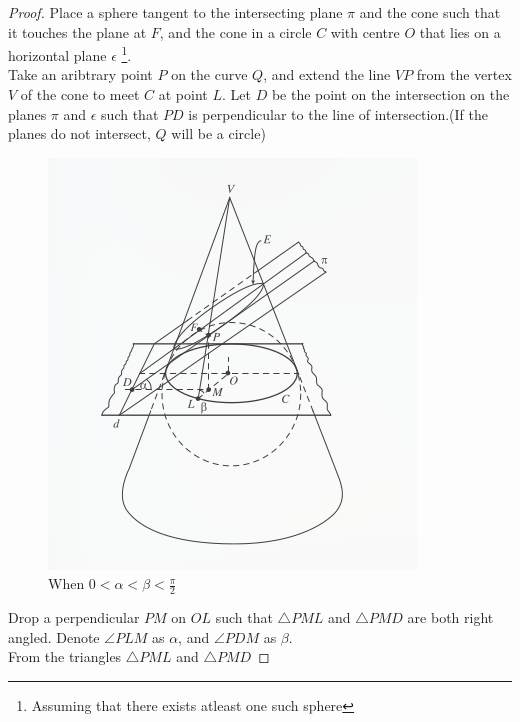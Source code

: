 \begin{proof}
  Place a sphere tangent to the intersecting plane $\pi$ and the cone such that it touches the plane at $F$, and the
  cone in a circle $C$ with centre $O$ that lies on a horizontal plane $\epsilon$
  \footnote{Assuming that there exists atleast one such sphere}.\\
  Take an aribtrary point $P$ on the curve $Q$, and extend the line $VP$ from the vertex $V$ of the cone
  to meet $C$ at point $L$. Let $D$ be the point on the intersection on the planes $\pi$ and $\epsilon$ such that
  $PD$ is perpendicular to the line of intersection.(If the planes do not intersect, $Q$ will be a circle)

  \begin{figure}[H]
    \includegraphics[width=\linewidth]{dandelin.png}
    \caption{When $0<\alpha<\beta<\frac{\pi}{2}$}
  \end{figure}

  Drop a perpendicular $PM$ on $OL$ such that $\triangle PML$ and $\triangle PMD$ are both right angled.
  Denote $\angle PLM$ as $\alpha$, and $\angle PDM$ as $\beta$.\\
  From the triangles  $\triangle PML$ and $\triangle PMD$ 
  

\end{proof}
